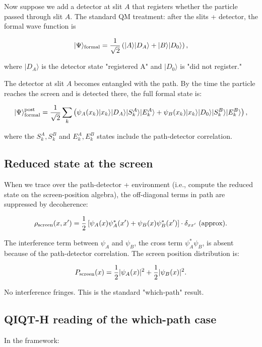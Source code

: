 \documentclass[11pt,a4paper]{article}
\begin{document}
Now suppose we add a detector at slit $A$ that registers whether the particle passed through slit $A$. The standard QM treatment: after the slits + detector, the formal wave function is

\[
|\Psi\rangle_{\rm formal} = \frac{1}{\sqrt{2}}\left(|A\rangle|D_A\rangle + |B\rangle|D_0\rangle\right),
\]

where $|D_A\rangle$ is the detector state "registered A" and $|D_0\rangle$ is "did not register."

The detector at slit $A$ becomes entangled with the path. By the time the particle reaches the screen and is detected there, the full formal state is:

\[
|\Psi\rangle_{\rm formal}^{\rm post} = \frac{1}{\sqrt{2}}\sum_k\left(\psi_A(x_k) |x_k\rangle|D_A\rangle|S_k^A\rangle|E_k^A\rangle + \psi_B(x_k) |x_k\rangle|D_0\rangle|S_k^B\rangle|E_k^B\rangle\right),
\]

where the $S_k^A, S_k^B$ and $E_k^A, E_k^B$ states include the path-detector correlation.

\subsection{Reduced state at the screen}

When we trace over the path-detector + environment (i.e., compute the reduced state on the screen-position algebra), the off-diagonal terms in path are suppressed by decoherence:

\[
\rho_{\rm screen}(x, x') = \frac{1}{2}\left[\psi_A(x)\psi_A^*(x') + \psi_B(x)\psi_B^*(x')\right] \cdot \delta_{xx'} \text{ (approx)}.
\]

The interference term between $\psi_A$ and $\psi_B$, the cross term $\psi_A^*\psi_B$, is absent because of the path-detector correlation. The screen position distribution is:

\[
P_{\rm screen}(x) = \frac{1}{2}|\psi_A(x)|^2 + \frac{1}{2}|\psi_B(x)|^2.
\]

No interference fringes. This is the standard "which-path" result.

\subsection{QIQT-H reading of the which-path case}

In the framework:
\end{document}
